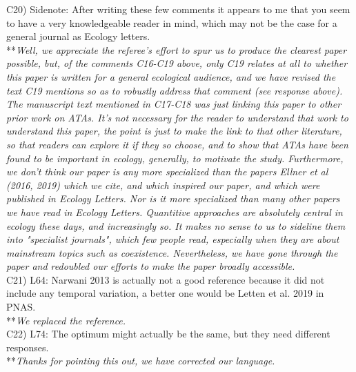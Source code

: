 \documentclass[letterpaper,11pt]{article}
\begin{document}
\noindent C20) Sidenote: After writing these few comments it appears to me that you seem to have a very knowledgeable reader in mind, which may not be the case for a general journal as Ecology letters. \\

\noindent ***\emph{Well, we appreciate the referee's effort to spur us to produce the clearest 
paper possible, but, of the comments 
C16-C19 above, only C19 relates at all to whether this paper is written for a general ecological audience,
and we have revised the text C19 mentions so as to robustly address that comment (see response above). 
The manuscript text mentioned in C17-C18 was just linking this paper to other prior work on ATAs. 
It's not necessary for the reader to understand that work to understand this paper, the point is just to make 
the link to that other literature, so that readers can explore it if they so choose, 
and to show that ATAs have been found to be important in ecology, generally, to motivate the study.
Furthermore, we don't think our paper is any more specialized than the papers Ellner et al (2016, 2019) which
we cite, and which inspired our paper, and which were published in Ecology Letters. Nor is it more 
specialized than many other papers we have read in Ecology Letters. Quantitive approaches are absolutely 
central in ecology these days, and increasingly so. It makes no sense to us to sideline them into 
"specialist journals", which few people read, especially when they are about mainstream topics such
as coexistence. Nevertheless, we have gone through the paper and redoubled our efforts to make the 
paper broadly accessible.} \\

\noindent C21) L64: Narwani 2013 is actually not a good reference because it did not include any temporal variation, a better one would be Letten et al. 2019 in PNAS. \\

\noindent ***\emph{We replaced the reference.} \\

\noindent C22) L74: The optimum might actually be the same, but they need different responses. \\

\noindent ***\emph{Thanks for pointing this out, we have corrected our language.} \\
\end{document}
